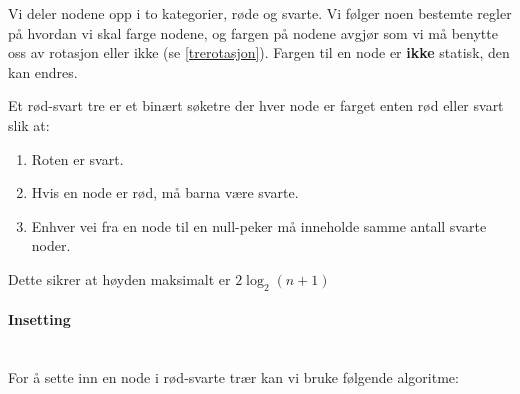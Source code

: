 Vi deler nodene opp i to kategorier, røde og svarte. Vi følger noen bestemte regler på hvordan vi skal farge nodene, og fargen på nodene avgjør som vi må benytte oss av rotasjon eller ikke (se \ref{trerotasjon}). Fargen til en node er \textbf{ikke} statisk, den kan endres.

\begin{definition}
\label{def:rb_tree}
Et rød-svart tre er et binært søketre der hver node er
farget enten rød eller svart slik at:
\begin{enumerate}[i]
\item Roten er svart.
\item Hvis en node er rød, må barna være svarte.
\item Enhver vei fra en node til en null-peker må inneholde samme antall svarte noder.
\end{enumerate}
\end{definition}

Dette sikrer at høyden maksimalt er $ 2\log_2 (n+1) $

\paragraph{Insetting}~\\
For å sette inn en node i rød-svarte trær kan vi bruke følgende algoritme:

